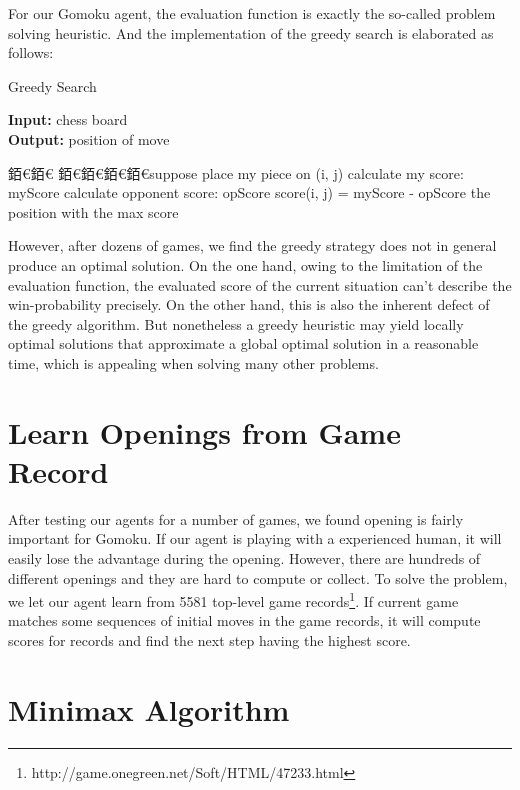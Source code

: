 \documentclass[12pt,a4paper]{article}
\begin{document}
For our Gomoku agent, the evaluation function is exactly the so-called problem solving heuristic.
And the implementation of the greedy search is elaborated as follows:
\begin{algorithm}[h]
\caption{Greedy Search}
\hspace*{0.02in} {\bf Input:}
chess board\\
\hspace*{0.02in} {\bf Output:}
position of move
\begin{algorithmic}
銆€銆€
銆€銆€銆€銆€\State suppose place my piece on (i, j)
		\State calculate my score: myScore
        		\State calculate opponent score: opScore
        		\State score(i, j) = myScore - opScore
	\EndIf
\EndFor
\Return the position with the max score
\end{algorithmic}
\end{algorithm}

However, after dozens of games, we find the greedy strategy does not in general produce an optimal solution. On the one hand, owing to the limitation of the evaluation function, the evaluated score of the current situation can't describe the win-probability precisely. On the other hand, this is also the inherent defect of the greedy algorithm. But nonetheless a greedy heuristic may yield locally optimal solutions that approximate a global optimal solution in a reasonable time, which is appealing when solving many other problems.


\section{Learn Openings from Game Record}
After testing our agents for a number of games, we found opening is fairly important for Gomoku. If our agent is playing with a experienced human, it will easily lose the advantage during the opening. However, there are hundreds of different openings and they are hard to compute or collect. To solve the problem, we let our agent learn from 5581 top-level game records\footnote{http://game.onegreen.net/Soft/HTML/47233.html}. If current game matches some sequences of initial moves in the game records, it will compute scores for records and find the next step having the highest score.

\section{Minimax Algorithm}
\end{document}
